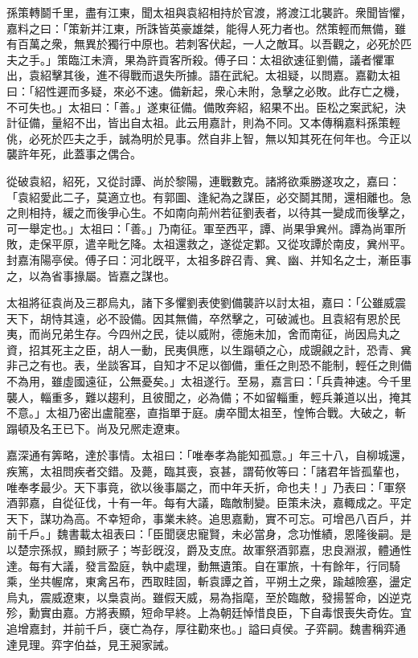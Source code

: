 \begin{pinyinscope}
孫策轉鬬千里，盡有江東，聞太祖與袁紹相持於官渡，將渡江北襲許。衆聞皆懼，嘉料之曰：「策新并江東，所誅皆英豪雄桀，能得人死力者也。然策輕而無備，雖有百萬之衆，無異於獨行中原也。若刺客伏起，一人之敵耳。以吾觀之，必死於匹夫之手。」策臨江未濟，果為許貢客所殺。傅子曰：太祖欲速征劉備，議者懼軍出，袁紹擊其後，進不得戰而退失所據。語在武紀。太祖疑，以問嘉。嘉勸太祖曰：「紹性遲而多疑，來必不速。備新起，衆心未附，急擊之必敗。此存亡之機，不可失也。」太祖曰：「善。」遂東征備。備敗奔紹，紹果不出。臣松之案武紀，決計征備，量紹不出，皆出自太祖。此云用嘉計，則為不同。又本傳稱嘉料孫策輕佻，必死於匹夫之手，誠為明於見事。然自非上智，無以知其死在何年也。今正以襲許年死，此蓋事之偶合。

從破袁紹，紹死，又從討譚、尚於黎陽，連戰數克。諸將欲乘勝遂攻之，嘉曰：「袁紹愛此二子，莫適立也。有郭圖、逢紀為之謀臣，必交鬬其閒，還相離也。急之則相持，緩之而後爭心生。不如南向荊州若征劉表者，以待其一變成而後擊之，可一舉定也。」太祖曰：「善。」乃南征。軍至西平，譚、尚果爭兾州。譚為尚軍所敗，走保平原，遣辛毗乞降。太祖還救之，遂從定鄴。又從攻譚於南皮，兾州平。封嘉洧陽亭侯。傅子曰：河北旣平，太祖多辟召青、兾、幽、并知名之士，漸臣事之，以為省事掾屬。皆嘉之謀也。

太祖將征袁尚及三郡烏丸，諸下多懼劉表使劉備襲許以討太祖，嘉曰：「公雖威震天下，胡恃其遠，必不設備。因其無備，卒然擊之，可破滅也。且袁紹有恩於民夷，而尚兄弟生存。今四州之民，徒以威附，德施未加，舍而南征，尚因烏丸之資，招其死主之臣，胡人一動，民夷俱應，以生蹋頓之心，成覬覦之計，恐青、兾非己之有也。表，坐談客耳，自知才不足以御備，重任之則恐不能制，輕任之則備不為用，雖虛國遠征，公無憂矣。」太祖遂行。至易，嘉言曰：「兵貴神速。今千里襲人，輜重多，難以趨利，且彼聞之，必為備；不如留輜重，輕兵兼道以出，掩其不意。」太祖乃密出盧龍塞，直指單于庭。虜卒聞太祖至，惶怖合戰。大破之，斬蹋頓及名王已下。尚及兄熈走遼東。

嘉深通有筭略，達於事情。太祖曰：「唯奉孝為能知孤意。」年三十八，自柳城還，疾篤，太祖問疾者交錯。及薨，臨其喪，哀甚，謂荀攸等曰：「諸君年皆孤輩也，唯奉孝最少。天下事竟，欲以後事屬之，而中年夭折，命也夫！」乃表曰：「軍祭酒郭嘉，自從征伐，十有一年。每有大議，臨敵制變。臣策未決，嘉輙成之。平定天下，謀功為高。不幸短命，事業未終。追思嘉勳，實不可忘。可增邑八百戶，并前千戶。」魏書載太祖表曰：「臣聞襃忠寵賢，未必當身，念功惟績，恩隆後嗣。是以楚宗孫叔，顯封厥子；岑彭旣沒，爵及支庶。故軍祭酒郭嘉，忠良淵淑，體通性達。每有大議，發言盈庭，執中處理，動無遺策。自在軍旅，十有餘年，行同騎乘，坐共幄席，東禽呂布，西取眭固，斬袁譚之首，平朔土之衆，踰越險塞，盪定烏丸，震威遼東，以梟袁尚。雖假天威，易為指麾，至於臨敵，發揚誓命，凶逆克殄，勳實由嘉。方將表顯，短命早終。上為朝廷悼惜良臣，下自毒恨喪失奇佐。宜追增嘉封，并前千戶，襃亡為存，厚往勸來也。」謚曰貞侯。子弈嗣。魏書稱弈通達見理。弈字伯益，見王昶家誡。


\end{pinyinscope}
